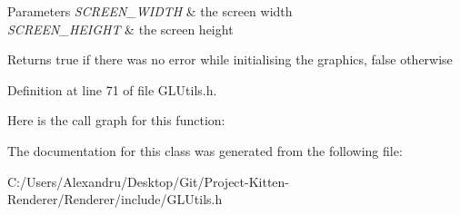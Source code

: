 \begin{DoxyParams}{Parameters}
{\em S\+C\+R\+E\+E\+N\+\_\+\+W\+I\+D\+T\+H} & the screen width \\
\hline
{\em S\+C\+R\+E\+E\+N\+\_\+\+H\+E\+I\+G\+H\+T} & the screen height \\
\hline
\end{DoxyParams}
\begin{DoxyReturn}{Returns}
true if there was no error while initialising the graphics, false otherwise 
\end{DoxyReturn}


Definition at line 71 of file G\+L\+Utils.\+h.



Here is the call graph for this function\+:




The documentation for this class was generated from the following file\+:\begin{DoxyCompactItemize}
\item 
C\+:/\+Users/\+Alexandru/\+Desktop/\+Git/\+Project-\/\+Kitten-\/\+Renderer/\+Renderer/include/G\+L\+Utils.\+h\end{DoxyCompactItemize}
